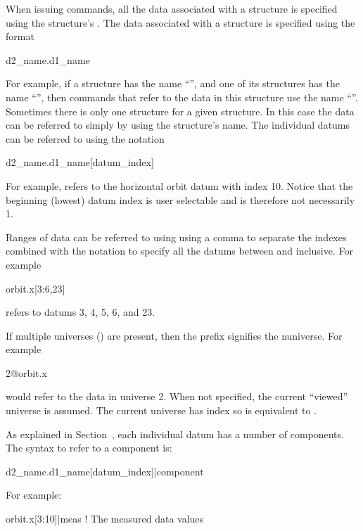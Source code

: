 When issuing \tao commands, all the
data associated with a  structure is specified using the
 structure's .  The data associated with a
 structure is specified using the format
\begin{example}
  d2_name.d1_name
\end{example}
For example, if a  structure has the
name ``'', and one of its  structures has the
name ``'', then \tao commands that refer to the data in this
 structure use the name ``''. Sometimes there
is only one  structure for a given 
structure. In this case the data can be referred to simply by using
the  structure's name. The individual datums can be
referred to using the notation
\begin{example}
  d2_name.d1_name[datum_index]
\end{example}
For example,  refers to the horizontal orbit datum
with index 10. Notice that the beginning (lowest) datum index is user
selectable and is therefore not necessarily 1.

Ranges of data can be referred to using using a comma \vn{,} to
separate the indexes combined with the notation  to specify
all the datums between  and  inclusive. For example
\begin{example}
  orbit.x[3:6,23]
\end{example}
refers to datums 3, 4, 5, 6, and 23. 

If multiple universes () are present, then the prefix
 signifies the n\Th universe. For example
\begin{example}
  2@orbit.x
\end{example}
would refer to the  data in universe 2. When not
specified, the current ``viewed'' universe is assumed. The current
 universe has index  so  is
equivalent to .

As explained in Section~, each individual datum
has a number of components. The syntax to refer to a component is:
\begin{example}
  d2_name.d1_name[datum_index]|component
\end{example}
For example:
\begin{example}
  orbit.x[3:10]|meas     ! The measured data values
\end{example}

